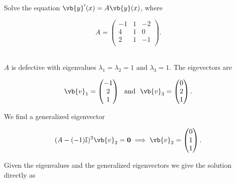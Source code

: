\documentclass[english,a4paper,12pt]{report}
\begin{document}
{Solve the equation \(\vb{y} '(x) = A\vb{y} (x)\), where 

\begin{equation}
    A = \begin{pmatrix}
        -1 & 1 &  -2 \\
        4 & 1 &  0 \\
        2 & 1 &  -1 \\
    \end{pmatrix}. 
\end{equation}
~
}
{\(A\) is defective with eigenvalues \(\lambda _{1} = \lambda _{2} = 1  \text { and } \lambda _{3} = 1 \). The eigevectors are 

\begin{equation}
    \vb{v} _{1} = \begin{pmatrix}
         -1 \\
         2 \\
         1 \\
    \end{pmatrix} ~\text { and }~ \vb{v} _{3} = \begin{pmatrix}
         0 \\
         2 \\
         1 \\
    \end{pmatrix}.  
\end{equation}

We find a generalized eigenvector 

\begin{equation}
    (A - (-1)\mathbb{I})^2 \vb{v} _{2} = \boldsymbol{0} \implies \vb{v} _{2} = \begin{pmatrix}
         0 \\
         1 \\
         1 \\
    \end{pmatrix}.  
\end{equation}

Given the eigenvalues and the generalized eigenvectors we give the solution directly as 

}
\end{document}
